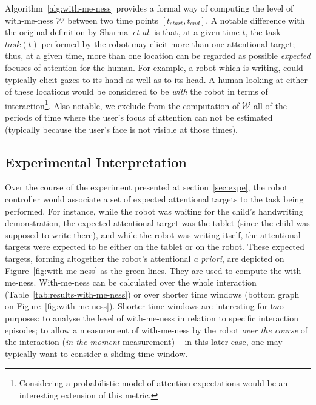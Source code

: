 \documentclass{sig-alternate}
\newcommand{\etal}{\textit{et al.}\xspace}
\begin{document}
Algorithm~\ref{alg:with-me-ness} provides a formal way of computing the level of
with-me-ness $\mathcal{W}$ between two time points $[t_{start}, t_{end}]$. A
notable difference with the original definition by Sharma~\etal is that, at a
given time $t$, the task $task(t)$ performed by the robot may elicit more than
one attentional target; thus, at a given time, more than one location can be
regarded as possible \emph{expected} focuses of attention for the human. For
example, a robot which is writing, could typically elicit gazes to its hand as
well as to its head. A human looking at either of these locations would be
considered to be \emph{with} the robot in terms of
interaction\footnote{Considering a probabilistic model of
attention expectations would be an interesting extension of this metric.}. Also notable, we exclude from the computation of
$\mathcal{W}$ all of the periods of time where the user's focus of attention can
not be estimated (typically because the user's
face is not visible at those times).

\subsection{Experimental Interpretation}

Over the course of the experiment presented at section~\ref{sec:expe}, the robot
controller would associate a set of expected attentional targets to the task being
performed. For instance, while the robot was waiting for the child's handwriting
demonstration, the expected attentional target was the tablet (since the child
was supposed to write there), and while the robot was writing itself, the
attentional targets were expected to be either on the tablet or on the robot.
These expected targets, forming altogether the robot's attentional {\it a
priori}, are depicted on Figure~\ref{fig:with-me-ness} as the green lines. They
are used to compute the with-me-ness. With-me-ness can be calculated over the
whole interaction (Table~\ref{tab:results-with-me-ness}) or over shorter time
windows (bottom graph on Figure~\ref{fig:with-me-ness}). Shorter time windows
are interesting for two purposes: to analyse the level of with-me-ness in
relation to specific interaction episodes; to allow a measurement of
with-me-ness by the robot \emph{over the course} of the interaction
(\emph{in-the-moment} measurement) -- in this later case, one may typically want
to consider a sliding time window.
\end{document}
